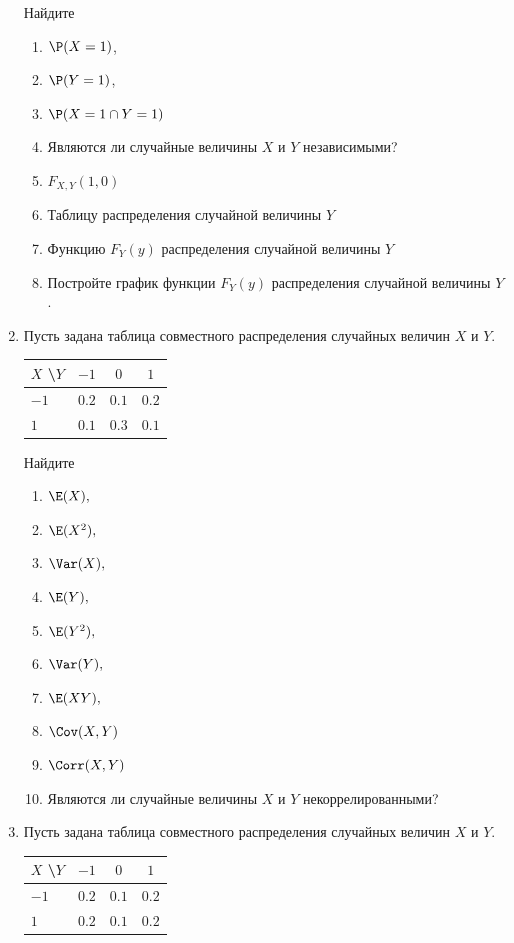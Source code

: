 \begin{enumerate}
Найдите
\begin{enumerate}
\item $\P(X = 1)$,
\item $\P(Y = 1)$,
\item $\P(X = 1 \cap Y = 1)$
\item Являются ли случайные величины $X$ и $Y$ независимыми?
\item $F_{X,Y}(1,0)$
\item Таблицу распределения случайной величины $Y$
\item Функцию $F_{Y}(y)$ распределения случайной величины $Y$
\item Постройте график функции $F_{Y}(y)$ распределения случайной величины $Y$.
\end{enumerate}

\item Пусть задана таблица совместного распределения случайных величин $X$ и $Y$.

\begin{center}\begin{tabular}{lccc}
\toprule
 $X$ \textbackslash $Y$    & $-1$  & $0$   & $1$   \\ \midrule
$-1$                 & $0.2$ & $0.1$ & $0.2$ \\
 $1$                 & $0.1$ & $0.3$ & $0.1$ \\ \bottomrule
\end{tabular}\end{center}

Найдите
\begin{enumerate}
    \item $\E(X),$
    \item $\E(X^{2}),$
	\item $\Var(X),$
    \item $\E(Y),$
    \item $\E(Y^{2}),$
    \item $\Var(Y),$
    \item $\E(XY),$
	\item $\Cov(X,Y)$
    \item $\Corr(X,Y)$
    \item Являются ли случайные величины $X$ и $Y$ некоррелированными?
\end{enumerate}

\item Пусть задана таблица совместного распределения случайных величин $X$ и $Y$.

\begin{center}\begin{tabular}{lccc}
\toprule
 $X$ \textbackslash $Y$    & $-1$  &$ 0 $  & $1 $  \\ \midrule
$-1$                 & $0.2$ & $0.1$ & $0.2$ \\
 $1$                 & $0.2$ & $0.1$ & $0.2$ \\ \bottomrule
\end{tabular}\end{center}


\end{enumerate}
